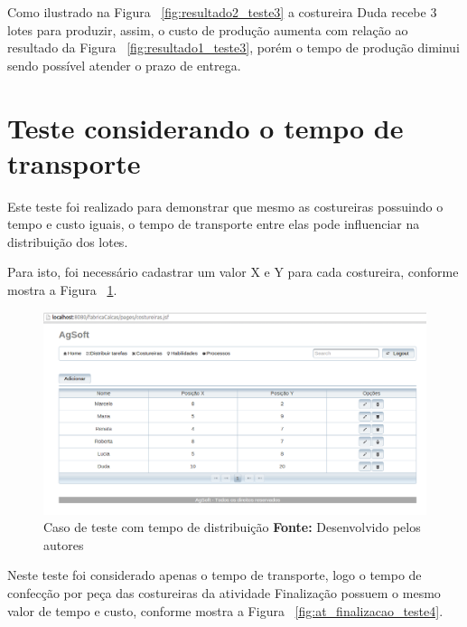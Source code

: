 \par Como ilustrado na Figura ~\ref{fig:resultado2_teste3} a costureira Duda
recebe 3 lotes para produzir, assim, o custo de produção aumenta com relação ao 
resultado da Figura ~\ref{fig:resultado1_teste3}, porém o tempo de produção diminui
sendo possível atender o prazo de entrega.


\section{Teste considerando o tempo de transporte}

\par Este teste foi realizado para demonstrar que mesmo as costureiras possuindo
o tempo e custo iguais, o tempo de transporte entre elas pode influenciar na distribuição dos lotes.

\par Para isto, foi necessário cadastrar um valor X e Y para cada costureira, 
conforme mostra a Figura ~\ref{fig:add_xy_costureira_teste4}.

\newpage


\begin{figure}[h!]
	\centerline{\includegraphics[scale=0.3]{./imagens/posicao_xy_costureiras_teste4.png}}
	\caption[Caso de teste com tempo de distribuição]
	{Caso de teste com tempo de distribuição \textbf{Fonte:} Desenvolvido pelos autores}
	\label{fig:add_xy_costureira_teste4}
\end{figure}



\par Neste teste foi considerado apenas o tempo de transporte, logo o tempo de
confecção por peça das costureiras da atividade Finalização possuem o mesmo
valor de tempo e custo, conforme mostra a Figura
~\ref{fig:at_finalizacao_teste4}.


